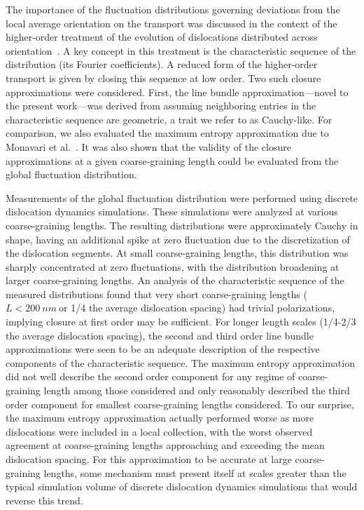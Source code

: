 The importance of the fluctuation distributions governing deviations from the local average orientation on the transport was discussed in the context of the higher-order treatment of the evolution of dislocations distributed across orientation~\cite{Hochrainer2015}. A key concept in this treatment is the characteristic sequence of the distribution (its Fourier coefficients). A reduced form of the higher-order transport is given by closing this sequence at low order. Two such closure approximations were considered. First, the line bundle approximation---novel to the present work---was derived from assuming neighboring entries in the characteristic sequence are geometric, a trait we refer to as Cauchy-like. For comparison, we also evaluated the maximum entropy approximation due to Monavari et al.~\cite{Monavari2016}. It was also shown that the validity of the closure approximations at a given coarse-graining length could be evaluated from the global fluctuation distribution.

Measurements of the global fluctuation distribution were performed using discrete dislocation dynamics simulations. These simulations were analyzed at various coarse-graining lengths. The resulting distributions were approximately Cauchy in shape, having an additional spike at zero fluctuation due to the discretization of the dislocation segments. At small coarse-graining lengths, this distribution was sharply concentrated at zero fluctuations, with the distribution broadening at larger coarse-graining lengths. An analysis of the characteristic sequence of the measured distributions found that very short coarse-graining lengths (\(L < 200\ nm\ \)or 1/4 the average dislocation spacing) had trivial polarizations, implying closure at first order may be sufficient. For longer length scales (1/4-2/3 the average dislocation spacing), the second and third order line bundle approximations were seen to be an adequate description of the respective components of the characteristic sequence. {The maximum entropy approximation did not well describe the second order component for any regime of coarse-graining length among those considered and only reasonably described the third order component for smallest coarse-graining lengths considered. To our surprise, the maximum entropy approximation actually performed worse as more dislocations were included in a local collection, with the worst observed agreement at coarse-graining lengths approaching and exceeding the mean dislocation spacing. For this approximation to be accurate at large coarse-graining lengths, some mechanism must present itself at scales greater than the typical simulation volume of discrete dislocation dynamics simulations that would reverse this trend.}

